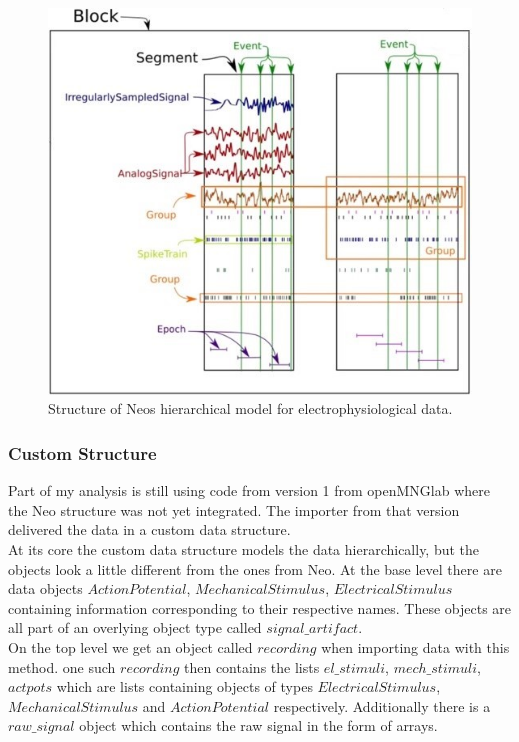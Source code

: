 \begin{figure}
	\includegraphics[width = \textwidth]{src/pic/neo_structure}
	\caption{Structure of Neos hierarchical model for electrophysiological data.}
	\label{fig:neostructure}
\end{figure}

\subsubsection{Custom Structure}
Part of my analysis is still using code from version 1 from openMNGlab where the Neo structure was not yet integrated. The importer from that version delivered the data in a custom data structure.\\
At its core the custom data structure models the data hierarchically, but the objects look a little different from the ones from Neo. At the base level there are data objects $ActionPotential$, $MechanicalStimulus$, $ElectricalStimulus$ containing information corresponding to their respective names. These objects are all part of an overlying object type called $signal\_artifact$.\\
On the top level we get an object called $recording$ when importing data with this method. one such $recording$ then contains the lists $el\_stimuli$, $mech\_stimuli$, $actpots$ which are lists containing objects of types $ElectricalStimulus$, $MechanicalStimulus$ and $ActionPotential$ respectively. Additionally there is a $raw\_signal$ object which contains the raw signal in the form of arrays.

